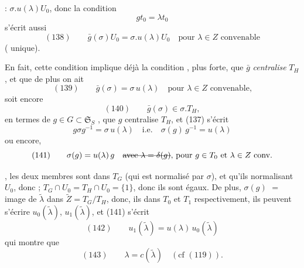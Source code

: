 \documentclass[11pt,a4paper]{article}
\begin{document}
 : $\sigma.u(\lambda)U_0$, donc la condition
\[
gt_0=\lambda t_0
\]
s'écrit aussi
\[
(138)\qquad \bar g(\sigma)U_0=\sigma.u(\lambda)U_0 \quad \text{pour } \lambda\in Z \text{ convenable}
\]
( unique).

En fait, cette condition implique déjà la condition \ill{}, plus forte, que $\bar g$
 \emph{centralise} $T_H$ , et que de plus on ait
\[
(139)\qquad \bar g(\sigma)=\sigma\,u(\lambda) \quad \text{pour } \lambda\in Z \text{ convenable,}
\]
soit encore
\[
(140)\qquad \bar g(\sigma)\in\sigma.T_H ,
\]
  en termes de $g\in G\subset\mathfrak{S}_S$ ,
   que $g$ centralise $T_H$, et (137) s'écrit
\[
g\sigma g^{-1}=\sigma\,u(\lambda) \quad\text{i.e.}\quad \sigma(g)\,g^{-1}=u(\lambda)
\]
ou encore,  
\[
(141)\qquad \sigma(g)=u(\lambda)\,g
\quad \text{\struck{avec $\lambda=\delta(g)$}, pour $g\in T_0$ et $\lambda\in Z$ conv.}
\]

 , les deux membres sont dans $T_G$ (qui est normalisé par
$\sigma$), et \ill{} qu'ils \ill{} normalisant $U_0$, donc \ill{} ;
$T_G\cap U_0=T_H\cap U_0=\{1\}$, donc ils sont égaux. De plus,   $\sigma(g)$ 
\ill{} $= $ image de $\tilde\lambda$ dans $\widetilde{Z}=T_G/T_H$, donc,
\struck{\ill{}} ils \ill{} dans $T_0$ et $T_1$ respectivement, ils peuvent s'écrire
$u_0(\tilde\lambda)$, $u_1(\tilde\lambda)$, et (141) s'écrit
\[
(142)\qquad u_1(\tilde\lambda)=u(\lambda)\,u_0(\tilde\lambda)
\]
qui montre que
\[
(143)\qquad \lambda=c(\tilde\lambda) \quad (\text{cf }(119)).
\]
\end{document}
